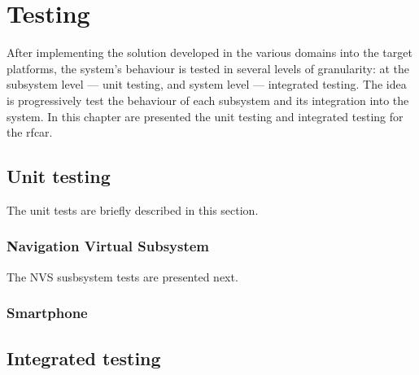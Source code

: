 \chapter{Testing}%
\label{ch:testing}
After implementing the solution developed in the various domains into the
target platforms, the system's behaviour is tested in several levels of
granularity: at the subsystem level --- unit testing, and system level ---
integrated testing. The idea is progressively test the behaviour of each
subsystem and its integration into the system.
In this chapter are presented the unit testing and integrated testing for the \gls{rfcar}.
%
\section{Unit testing}%
\label{sec:unit-testing}
The unit tests are briefly described in this section.
    \subsection{Navigation Virtual Subsystem}%
    \label{sec:navig-virt-subsyst-test}%
The NVS susbsystem tests are presented next.
    \label{sec:nvs-tests}
    
    
    \subsection{Smartphone}%
    \label{sec:smartphone-testing}
    
\section{Integrated testing}%
\label{sec:integrated-testing}

%
